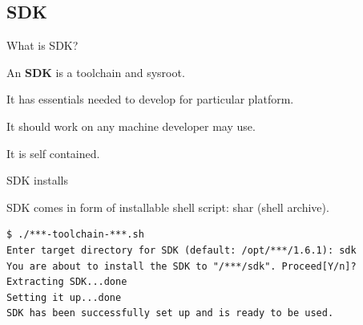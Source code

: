 \documentclass{beamer}
\begin{document}

\subsection{SDK}

\begin{frame}{What is SDK?}
    \begin{block}{}
        An \textbf{SDK} is a toolchain and sysroot.
    \end{block}
    \begin{block}{}
        It has essentials needed to develop for particular platform.
    \end{block}
    \begin{block}{}
        It should work on any machine developer may use.
    \end{block}
    \begin{block}{}
        It is self contained.
    \end{block}
\end{frame}

\begin{frame}[fragile]{SDK installs}
\begin{block}{}
SDK comes in form of installable shell script: shar
(shell archive).
\end{block}
\begin{lstlisting}[style=Console]
$ ./***-toolchain-***.sh
Enter target directory for SDK (default: /opt/***/1.6.1): sdk
You are about to install the SDK to "/***/sdk". Proceed[Y/n]?
Extracting SDK...done
Setting it up...done
SDK has been successfully set up and is ready to be used.
\end{lstlisting}
\end{frame}
\end{document}

